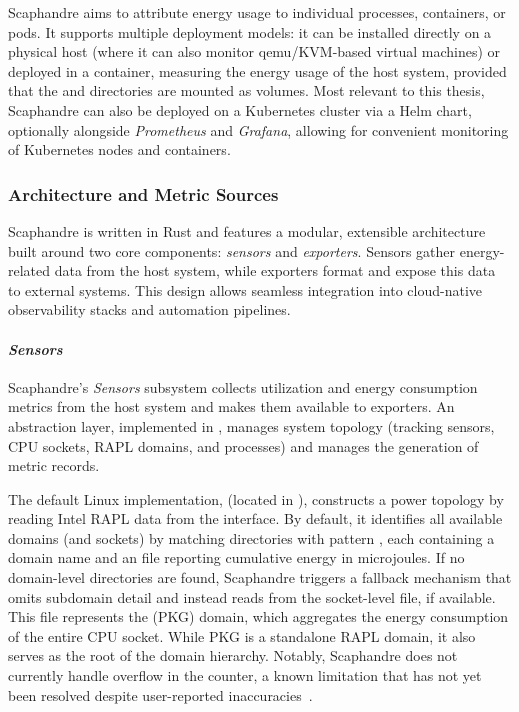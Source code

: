 Scaphandre aims to attribute energy usage to individual processes, containers, or pods. It supports multiple deployment models: it can be installed directly on a physical host (where it can also monitor qemu/KVM-based virtual machines) or deployed in a container, measuring the energy usage of the host system, provided that the  and  directories are mounted as volumes. Most relevant to this thesis, Scaphandre can also be deployed on a Kubernetes cluster via a Helm chart, optionally alongside \textit{Prometheus} and \textit{Grafana}, allowing for convenient monitoring of Kubernetes nodes and containers.

\subsubsection{Architecture and Metric Sources}
\label{sec:scaphandre-architecture}

Scaphandre is written in Rust and features a modular, extensible architecture built around two core components: \textit{sensors} and \textit{exporters}. Sensors gather energy-related data from the host system, while exporters format and expose this data to external systems. This design allows seamless integration into cloud-native observability stacks and automation pipelines.

\paragraph{\textit{Sensors}}

Scaphandre’s \textit{Sensors} subsystem collects utilization and energy consumption metrics from the host system and makes them available to exporters. An abstraction layer, implemented in , manages system topology (tracking sensors, CPU sockets, RAPL domains, and processes) and manages the generation of metric records.

The default Linux implementation,  (located in ), constructs a power topology by reading Intel RAPL data from the  interface. By default, it identifies all available domains (and sockets) by matching directories with pattern , each containing a domain name and an  file reporting cumulative energy in microjoules. If no domain-level directories are found, Scaphandre triggers a fallback mechanism that omits subdomain detail and instead reads from the socket-level file, if available. This file represents the  (PKG) domain, which aggregates the energy consumption of the entire CPU socket. While PKG is a standalone RAPL domain, it also serves as the root of the domain hierarchy. Notably, Scaphandre does not currently handle overflow in the  counter, a known limitation that has not yet been resolved despite user-reported inaccuracies~\cite{scaphandre_issue280}.


